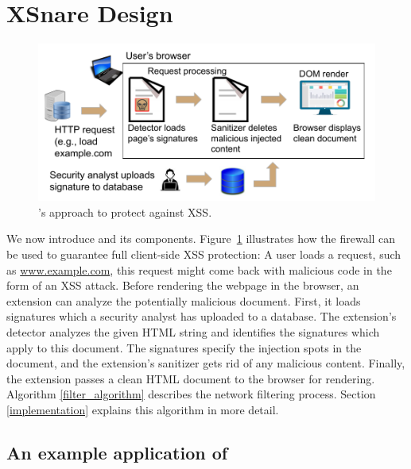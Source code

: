 \section{XSnare Design} \label{xsnare_design}

 \begin{figure}[h]
	\includegraphics[scale=0.55]{img/xsnare.pdf}
	\caption{\sys's approach to protect against XSS.}
	\label{fig:xsnare}
\end{figure}

We now introduce \sys and its components. %
%
%
Figure~\ref{fig:xsnare} illustrates how the firewall can be used to
guarantee full client-side XSS protection: A user loads a request,
such as \url{www.example.com}, this request might come back with
malicious code in the form of an XSS attack. Before rendering the
webpage in the browser, an extension can analyze the potentially
malicious document. First, it loads signatures which a security
analyst
has uploaded to a database. The extension's detector analyzes the
given HTML string and identifies the signatures which apply to this
document. The signatures specify the injection spots in the document,
and the extension's sanitizer gets rid of any malicious
content. Finally, the extension passes a clean HTML document to the
browser for rendering. Algorithm \ref{filter_algorithm} describes the
network filtering process. Section \ref{implementation} explains this
algorithm in more detail.
 
\subsection{An example application of \sys} \label{motivating_example}

